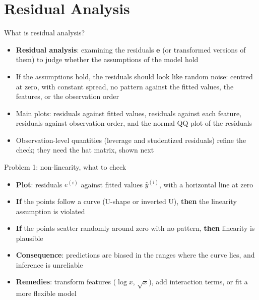 

\section{Residual Analysis}


\begin{frame}{What is residual analysis?}
    \begin{itemize}
        \item \textbf{Residual analysis}: examining the residuals $\mathbf{e}$ (or transformed versions of them) to judge whether the assumptions of the model hold
        \item If the assumptions hold, the residuals should look like random noise: centred at zero, with constant spread, no pattern against the fitted values, the features, or the observation order
        \item Main plots: residuals against fitted values, residuals against each feature, residuals against observation order, and the normal QQ plot of the residuals
        \item Observation-level quantities (leverage and studentized residuals) refine the check; they need the hat matrix, shown next
    \end{itemize}
\end{frame}


\begin{frame}{Problem 1: non-linearity, what to check}
    \begin{itemize}
        \item \textbf{Plot}: residuals $e^{(i)}$ against fitted values $\hat{y}^{(i)}$, with a horizontal line at zero
        \item \textbf{If} the points follow a curve (U-shape or inverted U), \textbf{then} the linearity assumption is violated
        \item \textbf{If} the points scatter randomly around zero with no pattern, \textbf{then} linearity is plausible
        \item \textbf{Consequence}: predictions are biased in the ranges where the curve lies, and inference is unreliable
        \item \textbf{Remedies}: transform features ($\log x$, $\sqrt{x}$), add interaction terms, or fit a more flexible model
    \end{itemize}
\end{frame}


